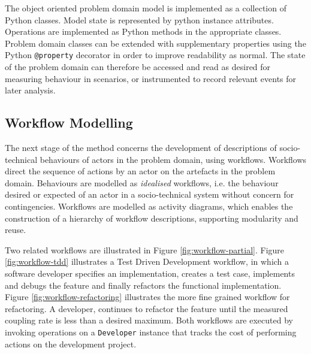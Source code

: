 \documentclass{sig-alternate}
\begin{document}
The object oriented problem domain model is implemented as a collection of Python classes.  Model state is represented
by python instance attributes.  Operations are implemented as Python methods in the appropriate classes.  Problem domain
classes can be extended with supplementary properties using the Python \lstinline!@property! decorator in order to
improve readability as normal.  The state of the problem domain can therefore be accessed and read as desired for
measuring behaviour in scenarios, or instrumented to record relevant events for later analysis.


\subsection{Workflow Modelling}


The next stage of the method concerns the development of descriptions of socio-technical behaviours of actors in the
problem domain, using workflows.  Workflows direct the sequence of actions by an actor on the artefacts in the problem
domain.  Behaviours are modelled as \emph{idealised} workflows, i.e. the behaviour desired or expected of an actor in a
socio-technical system without concern for contingencies.  Workflows are modelled as activity diagrams, which enables
the construction of a hierarchy of workflow descriptions, supporting modularity and reuse.

Two related workflows are illustrated in Figure \ref{fig:workflow-partial}.  Figure \ref{fig:workflow-tdd} illustrates a
Test Driven Development workflow, in which a software developer specifies an implementation, creates a test case,
implements and debugs the feature and finally refactors the functional implementation.  Figure
\ref{fig:workflow-refactoring} illustrates the more fine grained workflow for refactoring.  A developer, continues to
refactor the feature until the measured coupling rate is less than a desired maximum.  Both workflows are executed by
invoking operations on a \lstinline!Developer!  instance that tracks the cost of performing actions on the development
project.
\end{document}
